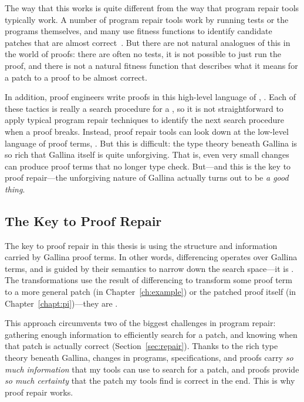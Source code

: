 The way that this works is quite different from the way that program repair tools typically work.
A number of program repair tools work by running tests or the programs themselves,
and many use fitness functions to identify candidate patches that 
are almost correct~\cite{Monperrus:2018:ASR:3177787.3105906}. %
But there are not natural analogues of this in the world of proofs:
there are often no tests, it is not possible to just run the proof, and there is not a natural 
fitness function that describes what it means for a patch to a proof to be almost correct.

In addition, proof engineers write proofs in this high-level language of , .
Each of these tactics is really a search procedure for a , so it is not straightforward to apply
typical program repair techniques to identify the next search procedure when a proof breaks.
Instead, proof repair tools can look down at the low-level language of proof terms, .
But this is difficult: the type theory  beneath Gallina is so rich that Gallina itself is quite unforgiving.
That is, even very small changes can produce proof terms that no longer type check.
But---and this is the key to proof repair---the unforgiving nature of Gallina actually turns out to be \textit{a good thing}.

\subsection{The Key to Proof Repair}
\label{sec:infocert}

The key to proof repair in this thesis is using the structure and information carried by Gallina proof terms.
In other words, differencing operates over Gallina terms,
and is guided by their semantics to narrow down the search space---it is .
The transformations use the result of differencing to transform some proof term to a more general patch (in Chapter~\ref{ch:example})
or the patched proof itself (in Chapter~\ref{chapt:pi})---they are .

This approach circumvents two of the biggest challenges in program repair:
gathering enough information to efficiently search for a patch,
and knowing when that patch is actually correct (Section~\ref{sec:repair}).
Thanks to the rich type theory beneath Gallina, changes in programs, specifications, and proofs
carry \textit{so much information} that my tools can use to search for a patch,
and proofs provide \textit{so much certainty} that the patch my tools find is correct in the end.
This is why proof repair works.

